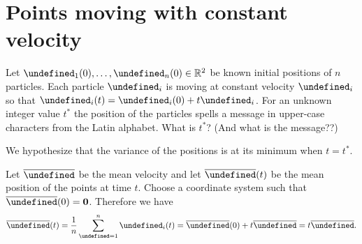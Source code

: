 \documentclass[12pt]{article}
\begin{document}




\section{Points moving with constant velocity}

\let\x\undefined
\let\v\undefined
\let\A\undefined
\let\B\undefined
\let\|\undefined
\newcommand{\|}{\Big|\Big|}
\newcommand{\x}{\vec x}
\newcommand{\v}{\vec v}
\newcommand{\A}{\vec A}
\newcommand{\B}{\vec B}

\begin{mdframed}
  Let $\x_1(0), \ldots, \x_n(0) \in \R^2$ be known initial positions of $n$ particles. Each particle
  $\x_i$ is moving at constant velocity $\v_i$ so that $\x_i(t) = \x_i(0) + t\v_i$. For an unknown
  integer value $t^*$ the position of the particles spells a message in upper-case characters from
  the Latin alphabet. What is $t^*$? (And what is the message??)
\end{mdframed}

We hypothesize that the variance of the positions is at its minimum when $t=t^*$.

Let $\bar \v$ be the mean velocity and let $\bar \x(t)$ be the mean position of the points at time
$t$. Choose a coordinate system such that $\bar \x(0) = \0$. Therefore we have
\begin{align*}
  \bar \x(t) = \frac{1}{n}\sum_{\x=1}^n \x_i(t)
             = \bar \x(0) + t\bar \v
             = t\bar \v.
\end{align*}
\end{document}

